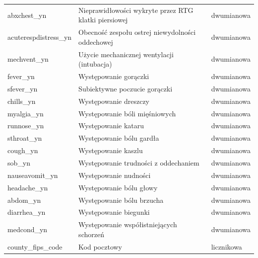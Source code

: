 \documentclass[polish, twoside, 12pt, a4paper]{article}
\theoremstyle{definition}
\theoremstyle{plain}
\theoremstyle{remark}
\begin{document}
\begin{landscape}
{\begin{longtable}{lll}
abxchest\_yn              & Nieprawidłowości wykryte przez RTG klatki piersiowej & dwumianowa                    \\
acuterespdistress\_yn     & Obecność zespołu ostrej niewydolności oddechowej     & dwumianowa                    \\
mechvent\_yn              & Użycie mechanicznej wentylacji (intubacja)           & dwumianowa                    \\
fever\_yn                 & Występowanie gorączki                                & dwumianowa                    \\
sfever\_yn                & Subiektywne poczucie gorączki                        & dwumianowa                    \\
chills\_yn                & Występowanie dreszczy                                & dwumianowa                    \\
myalgia\_yn               & Występowanie bóli mięśniowych                        & dwumianowa                    \\
runnose\_yn               & Występowanie kataru                                  & dwumianowa                    \\
sthroat\_yn               & Występowanie bólu gardła                             & dwumianowa                    \\
cough\_yn                 & Występowanie kaszlu                                  & dwumianowa                    \\
sob\_yn                   & Występowanie trudności z oddechaniem                 & dwumianowa                    \\
nauseavomit\_yn           & Występowanie nudności                                & dwumianowa                    \\
headache\_yn              & Występowanie bólu głowy                              & dwumianowa                    \\
abdom\_yn                 & Występowanie bólu brzucha                            & dwumianowa                    \\
diarrhea\_yn              & Występowanie biegunki                                & dwumianowa                    \\
medcond\_yn               & Występowanie współistniejących schorzeń              & dwumianowa                    \\
county\_fips\_code        & Kod pocztowy                                         & licznikowa                    \\

\end{longtable}}
\end{landscape}
\end{document}
